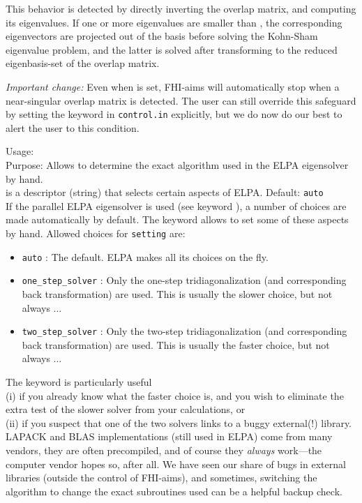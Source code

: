 This behavior is detected by directly inverting the overlap matrix, and
computing its eigenvalues. If one or more eigenvalues are smaller than
, the corresponding eigenvectors are projected out of the
basis before solving the Kohn-Sham eigenvalue problem, and the latter is solved
after transforming to the reduced eigenbasis-set of the overlap matrix.

\emph{Important change:} Even when  is set, FHI-aims
will automatically stop when a near-singular overlap matrix is detected. The
user can still override this safeguard by setting the
 keyword in \texttt{control.in} explicitly,
but we do now do our best to alert the user to this condition.

{
  \noindent
  Usage:   \\[1.0ex]
  Purpose: Allows to determine the exact algorithm used in the ELPA eigensolver
    by hand. \\[1.0ex]
   is a descriptor (string) that selects certain aspects of
    ELPA. Default: \texttt{auto} \\
}
If the parallel ELPA eigensolver is used (see keyword ), a
number of choices are made automatically by default. The
 keyword allows to set some of these aspects by hand.
Allowed choices for \texttt{setting} are:
\begin{itemize}
  \item \texttt{auto} : The default. ELPA makes all its choices on the fly.
  \item \texttt{one\_step\_solver} : Only the one-step tridiagonalization (and
    corresponding back transformation) are used. This is usually the slower
    choice, but not always ...
  \item \texttt{two\_step\_solver} : Only the two-step tridiagonalization (and
    corresponding back transformation) are used. This is usually the faster
    choice, but not always ...
\end{itemize}
The  keyword is particularly useful \\
(i) if you already know what the faster choice is, and you wish to eliminate the
extra test of the slower solver from your calculations, or \\
(ii) if you suspect that one of the two solvers links to a buggy external(!)
library. LAPACK and BLAS implementations (still used in ELPA) come from many
vendors, they are often precompiled, and of course they \emph{always} work---the
computer vendor hopes so, after all. We have seen our share of bugs in external
libraries (outside the control of FHI-aims), and sometimes, switching the
algorithm to change the exact subroutines used can be a helpful backup check.

